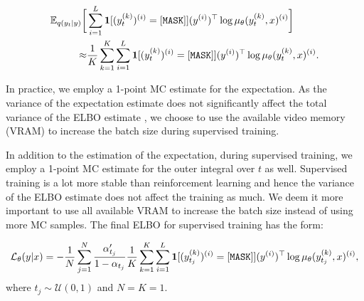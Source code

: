 \begin{align*}
    \mathbb{E}_{q(y_t | y)}\bigg[&\sum_{i=1}^{L}\bold{1}[(y_t^{(k)})^{(i)} = [\mathtt{MASK}]](y^{(i)})^\top\log\mu_\theta(y_t^{(k)}, x)^{(i)}\bigg] \\
    \approx & \frac{1}{K}\sum_{k=1}^{K}\sum_{i=1}^{L}\bold{1}[(y_t^{(k)})^{(i)} = [\mathtt{MASK}]](y^{(i)})^\top\log\mu_\theta(y_t^{(k)}, x)^{(i)}.
\end{align*}

In practice, we employ a 1-point MC estimate for the expectation. As the variance of the expectation estimate does not significantly affect the total variance of the ELBO estimate \cite{rojas2025improvingreasoningdiffusionlanguage}, we choose to use the available video memory (VRAM) to increase the batch size during supervised training.

In addition to the estimation of the expectation, during supervised training, we employ a 1-point MC estimate for the outer integral over $t$ as well. Supervised training is a lot more stable than reinforcement learning and hence the variance of the ELBO estimate does not affect the training as much. We deem it more important to use all available VRAM to increase the batch size instead of using more MC samples. The final ELBO for supervised training has the form:

\begin{equation}
    \mathcal{L}_\theta(y | x) = -\frac{1}{N}\sum_{j=1}^{N}\frac{\alpha_{t_j}'}{1 - \alpha_{t_j}}\frac{1}{K}\sum_{k=1}^{K}\sum_{i=1}^{L}\bold{1}[(y_{t_j}^{(k)})^{(i)} = [\mathtt{MASK}]](y^{(i)})^\top\log\mu_\theta(y_{t_j}^{(k)}, x)^{(i)},
    \label{eq:supervised ELBO}
\end{equation}
where $t_j\sim\mathcal{U}(0, 1)$ and $N = K = 1$.



